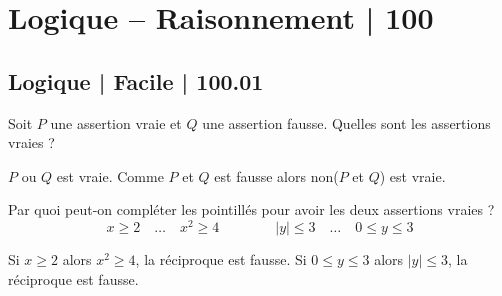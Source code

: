 


\section{Logique -- Raisonnement | 100}





\subsection{Logique | Facile | 100.01}


\begin{question}

Soit $P$ une assertion vraie et $Q$ une assertion fausse. Quelles sont les assertions vraies ?
\begin{answers}



\end{answers}
\begin{explanations}
$P$ ou $Q$ est vraie. Comme $P$ et $Q$ est fausse alors non($P$ et $Q$) est vraie.
\end{explanations}

\end{question}


\begin{question}

Par quoi peut-on compléter les pointillés pour avoir les deux assertions vraies ?
$$x\ge 2 \quad \ldots \quad x^2 \ge 4  \qquad \qquad |y| \le 3 \quad \ldots \quad 0 \le y \le 3$$
\begin{answers}


    
\end{answers}
\begin{explanations}
Si $x\ge 2$ alors $x^2 \ge 4$, la réciproque est fausse.
Si $0 \le y \le 3$ alors $|y| \le 3$, la réciproque est fausse.
\end{explanations}
\end{question}


